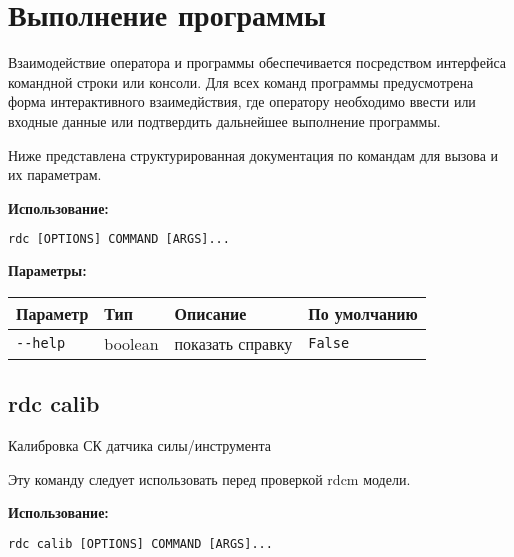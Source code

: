 \newpage
\section{Выполнение программы}

Взаимодействие оператора и программы обеспечивается посредством интерфейса командной строки или консоли.
Для всех команд программы предусмотрена форма интерактивного взаимедйствия, где оператору необходимо ввести или входные данные или подтвердить дальнейшее выполнение программы.

Ниже представлена структурированная документация по командам для вызова и их параметрам.

\textbf{Использование:}
\begin{lstlisting}[language=python, numbers=none, frame=single]
    rdc [OPTIONS] COMMAND [ARGS]...
\end{lstlisting}

\textbf{Параметры:}
\begin{center}
\fontsize{10pt}{10pt}\selectfont
\begin{longtable}[]{p{5cm}|p{2cm}|p{3.5cm}|p{5cm}}
    \hline
\toprule()
Параметр & Тип & Описание & По умолчанию \\
\hline
\midrule()
\endhead
\texttt{-\/-help} & boolean & показать справку &
\texttt{False} \\
\bottomrule()
\hline
\end{longtable}
\end{center}

\hypertarget{rdc-calib}{%
\subsection{rdc calib}\label{rdc-calib}}

Калибровка СК датчика силы/инструмента

Эту команду следует использовать перед проверкой rdcm модели.

\textbf{Использование:}
\begin{lstlisting}[language=python, numbers=none, frame=single]
rdc calib [OPTIONS] COMMAND [ARGS]...
\end{lstlisting}

